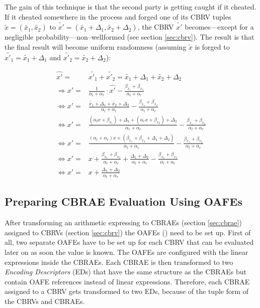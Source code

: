 \documentclass[12pt, a4paper]{article}
\begin{document}
The gain of this technique is that the second party is getting caught if it
cheated. If it cheated somewhere in the process and forged one of its CBRV
tuples $\widetilde{x} = (\widetilde{x_1}, \widetilde{x_2})$ to $\widetilde{x'} =
(\widetilde{x_1} + \Delta_1, \widetilde{x_2} + \Delta_2)$, the CBRV
$\widetilde{x'}$ becomes---except for a negligible probability---non--wellformed
(see section \ref{sec:cbrv}). The result is that the final
result will become uniform randomness (assuming $\widetilde{x}$ is forged to
$\widetilde{x'_1} = \widetilde{x_1} + \Delta_1$ and $\widetilde{x'_2} =
\widetilde{x_2} + \Delta_2$):

\begin{align*}
  \widehat{x'} = & \widetilde{x'_1} + \widetilde{x'_2} = \widetilde{x_1} +
  \Delta_1 + \widetilde{x_2} + \Delta_2 \\
  \Rightarrow x' = & \frac{1}{\alpha_l + \alpha_r} \cdot \widehat{x'} -
  \frac{\beta_{x_1} +
  \beta_{x_2}}{\alpha_l + \alpha_r} \\
  \Leftrightarrow x' = & \frac{\widetilde{x_1} + \Delta_1 +
  \widetilde{x_2} + \Delta_2}{\alpha_l + \alpha_r} -
  \frac{\beta_{x_1} +\beta_{x_2}}{\alpha_l + \alpha_r}\\
  \Leftrightarrow x' = & \frac{(\alpha_l x + \beta_{x_1}) + \Delta_1 +
  (\alpha_r x + \beta_{x_2}) + \Delta_2}{\alpha_r + \alpha_l} -
  \frac{\beta_{x_1} +\beta_{x_2}}{\alpha_l + \alpha_r} \\
  \Leftrightarrow x' = & \frac{(\alpha_l+\alpha_r)x + (\beta_{x_1}+\beta_{x_2} +
  \Delta_1+\Delta_2)}{\alpha_l+\alpha_r} -
  \frac{\beta_{x_1} +\beta_{x_2}}{\alpha_l + \alpha_r} \\
  \Leftrightarrow x' = & x + \frac{\beta_{x_1}+\beta_{x_2}}{\alpha_l+\alpha_r}
  + \frac{\Delta_1 + \Delta_2}{\alpha_l + \alpha_r} -
  \frac{\beta_{x_1}+\beta_{x_2}}{\alpha_l + \alpha_r} \\
  \Leftrightarrow x' = & x + \frac{\Delta_1 + \Delta_2}{\alpha_l + \alpha_r}
\end{align*}


%
%
\subsection{Preparing CBRAE Evaluation Using OAFEs}
\label{sec:prep-eval}

After transforming an arithmetic expressing to CBRAEs (section \ref{sec:cbrae})
assigned to CBRVs (section \ref{sec:cbrv}) the OAFEs (\cite{davidgoliath}) need
to be set up. First of all, two separate OAFEs have to be set up for each CBRV
that can be evaluated later on as soon the value is known. The OAFEs are
configured with the linear expressions inside the CBRAEs. Each CBRAE is then
transformed to two \emph{Encoding Descriptors} (EDs) that have the same
structure as the CBRAEs but contain OAFE references instead of linear
expressions. Therefore, each CBRAE assigned to a CBRV gets transformed to two
EDs, because of the tuple form of the CBRVs and CBRAEs.
\end{document}
